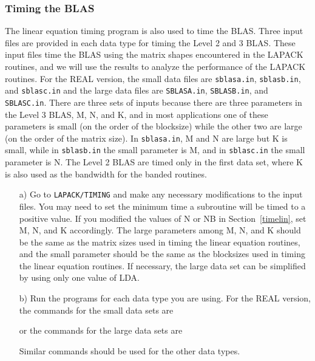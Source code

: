 \subsubsection{Timing the BLAS}\label{timeblas}

\dent
The linear equation timing program is also used to time the BLAS.
Three input files are provided in each data type for timing the Level
2 and 3 BLAS. 
These input files time the BLAS using the matrix shapes encountered
in the LAPACK routines, and we will use the results to analyze the
performance of the LAPACK routines. 
For the REAL version, the small data files are
{\tt sblasa.in}, {\tt sblasb.in}, and {\tt sblasc.in}
and the large data files are
{\tt SBLASA.in}, {\tt SBLASB.in}, and {\tt SBLASC.in}.
There are three sets of inputs because there are three
parameters in the Level 3 BLAS, M, N, and K, and
in most applications one of these parameters is small (on the order
of the blocksize) while the other two are large (on the order of the
matrix size).  
In {\tt sblasa.in}, M and N are large but K is
small, while in {\tt sblasb.in} the small parameter is M, and
in {\tt sblasc.in} the small parameter is N.  
The Level 2 BLAS are timed only in the first data set, where K
is also used as the bandwidth for the banded routines.

\begin{itemize}

\item[a)]
Go to {\tt LAPACK/TIMING} and
make any necessary modifications to the input files.
You may need to set the minimum time a subroutine will
be timed to a positive value.
If you modified the values of N or NB 
in Section~\ref{timelin}, set M, N, and K accordingly.
The large parameters among M, N, and K
should be the same as the matrix sizes used in timing the linear
equation routines,
and the small parameter should be the same as the
blocksizes used in timing the linear equation routines.
If necessary, the large data set can be simplified by using only one
value of LDA.

\item[b)]
Run the programs for each data type you are using. 
For the REAL version, the commands for the small data sets are

or the commands for the large data sets are

\noindent
Similar commands should be used for the other data types.
\end{itemize}


